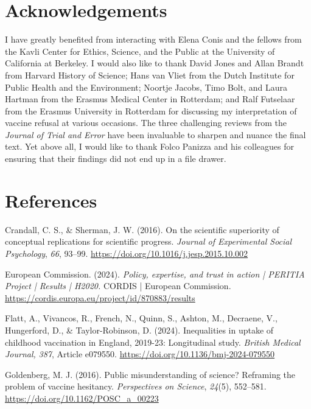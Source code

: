 \documentclass[authordate, reflection,issue]{jote-new-article}
\begin{document}
	\section{Acknowledgements}



	I have greatly benefited from interacting with Elena Conis and the fellows from the Kavli Center for Ethics, Science, and the Public at the University of California at Berkeley. I would also like to thank David Jones and Allan Brandt from Harvard History of Science; Hans van Vliet from the Dutch Institute for Public Health and the Environment; Noortje Jacobs, Timo Bolt, and Laura Hartman from the Erasmus Medical Center in Rotterdam; and Ralf Futselaar from the Erasmus University in Rotterdam for discussing my interpretation of vaccine refusal at various occasions. The three challenging reviews from the \emph{Journal of Trial and Error} have been invaluable to sharpen and nuance the final text. Yet above all, I would like to thank Folco Panizza and his colleagues for ensuring that their findings did not end up in a file drawer.







	\section{References}



	Crandall, C. S., \& Sherman, J. W. (2016). On the scientific superiority of conceptual replications for scientific progress. \emph{Journal of Experimental Social Psychology}, \emph{66}, 93--99. \url{https://doi.org/10.1016/j.jesp.2015.10.002}



	European Commission. (2024). \emph{Policy, expertise, and trust in action | PERITIA Project | Results | H2020. }CORDIS | European Commission. \url{https://cordis.europa.eu/project/id/870883/results}



	Flatt, A., Vivancos, R., French, N., Quinn, S., Ashton, M., Decraene, V., Hungerford, D., \& Taylor-Robinson, D. (2024). Inequalities in uptake of childhood vaccination in England, 2019-23: Longitudinal study. \emph{British Medical Journal,} \emph{387}, Article e079550. \url{https://doi.org/10.1136/bmj-2024-079550}



	Goldenberg, M. J. (2016). Public misunderstanding of science? Reframing the problem of vaccine hesitancy. \emph{Perspectives on Science}, \emph{24}(5), 552--581. \url{https://doi.org/10.1162/POSC\_a\_00223}
\end{document}
